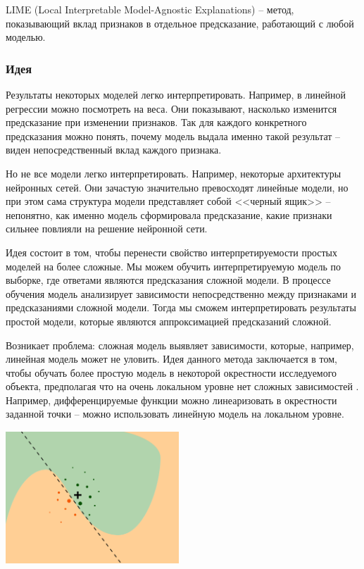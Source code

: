 LIME (Local Interpretable Model-Agnostic Explanations) -- метод, показывающий вклад признаков в отдельное предсказание, работающий с любой моделью.

\subsubsection{Идея}
Результаты некоторых моделей легко интерпретировать. Например, в линейной регрессии можно посмотреть на веса. Они показывают, насколько изменится предсказание при изменении признаков. Так для каждого конкретного предсказания можно понять, почему модель выдала именно такой результат -- виден непосредственный вклад каждого признака.

Но не все модели легко интерпретировать. Например, некоторые архитектуры нейронных сетей. Они зачастую значительно превосходят линейные модели, но при этом сама структура модели представляет собой <<черный ящик>> -- непонятно, как именно модель сформировала предсказание, какие признаки сильнее повлияли на решение нейронной сети.

Идея состоит в том, чтобы перенести свойство интерпретируемости простых моделей на более сложные. Мы можем обучить интерпретируемую модель по выборке, где ответами являются предсказания сложной модели. В процессе обучения модель анализирует зависимости непосредственно между признаками и предсказаниями сложной модели. Тогда мы сможем интерпретировать результаты простой модели, которые являются аппроксимацией предсказаний сложной.\\[2mm]
\begin{minipage}{0.57\linewidth}
\indent Возникает проблема: сложная модель выявляет зависимости, которые, например, линейная модель может не уловить. Идея данного метода заключается в том, чтобы обучать более простую модель в некоторой окрестности исследуемого объекта, предполагая что на очень локальном уровне нет сложных зависимостей \cite{lime_dop}. Например, дифференцируемые функции можно линеаризовать в окрестности заданной точки -- можно использовать линейную модель на локальном уровне.
\end{minipage}
\hspace{5mm}
\begin{minipage}{0.35\linewidth}
	\includegraphics[width=6.5cm, height=5cm]{pics/lime4.png}
\end{minipage}

